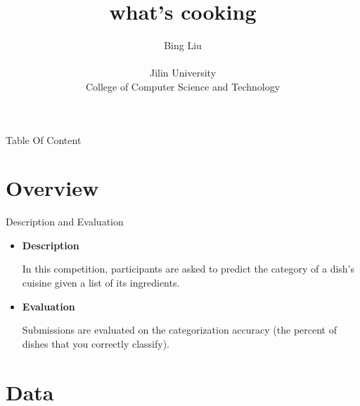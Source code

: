 \documentclass[
 size=14pt,
 paper=smartboard,  %
 mode=present, 		%
 display=slides, 	%
 style=tuliplab,  	%
 pauseslide,
 fleqn,leqno]{powerdot}
\title{what's cooking}
\author{
Bing Liu
\\
\\Jilin University
\\College of Computer Science and Technology
}
\date{\gitCommitterDate}
\renewcommand{\raggedright}{\leftskip=0pt \rightskip=0pt plus 0cm}
\begin{document}
\maketitle



\begin{slide}[toc=,bm=]{Table Of Content}
\tableofcontents[content=currentsection,type=1]
\end{slide}


\section{Overview}

\begin{slide}{Description and Evaluation}

\begin{itemize}
\item \textbf{Description}

\medskip    %
In this competition, participants are asked to predict the category of a dish's cuisine given a list of its ingredients. 

\bigskip
\bigskip
\item \textbf{Evaluation}

\medskip
Submissions are evaluated on the categorization accuracy (the percent of dishes that you correctly classify).

\end{itemize}

\end{slide}




\section{Data}
\end{document}
